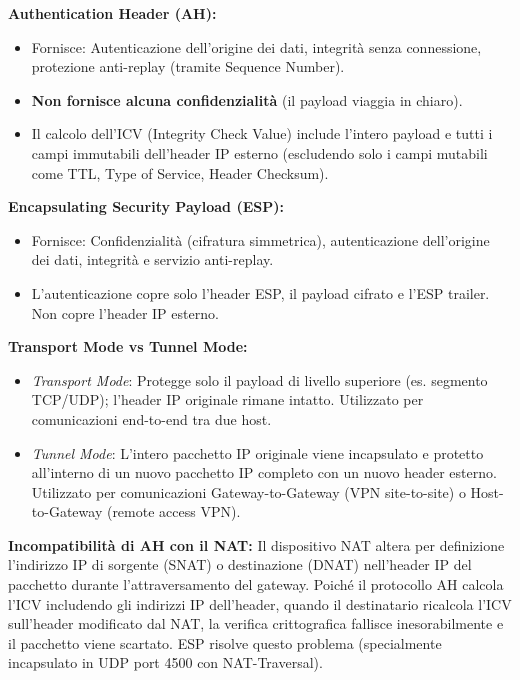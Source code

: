 \documentclass[11pt,a4paper]{article}
\begin{document}
\begin{solutionbox}
\textbf{Authentication Header (AH):}
\begin{itemize}
    \item Fornisce: Autenticazione dell'origine dei dati, integrit\`a senza connessione, protezione anti-replay (tramite Sequence Number).
    \item \textbf{Non fornisce alcuna confidenzialit\`a} (il payload viaggia in chiaro).
    \item Il calcolo dell'ICV (Integrity Check Value) include l'intero payload e tutti i campi immutabili dell'header IP esterno (escludendo solo i campi mutabili come TTL, Type of Service, Header Checksum).
\end{itemize}

\textbf{Encapsulating Security Payload (ESP):}
\begin{itemize}
    \item Fornisce: Confidenzialit\`a (cifratura simmetrica), autenticazione dell'origine dei dati, integrit\`a e servizio anti-replay.
    \item L'autenticazione copre solo l'header ESP, il payload cifrato e l'ESP trailer. Non copre l'header IP esterno.
\end{itemize}

\textbf{Transport Mode vs Tunnel Mode:}
\begin{itemize}
    \item \textit{Transport Mode}: Protegge solo il payload di livello superiore (es. segmento TCP/UDP); l'header IP originale rimane intatto. Utilizzato per comunicazioni end-to-end tra due host.
    \item \textit{Tunnel Mode}: L'intero pacchetto IP originale viene incapsulato e protetto all'interno di un nuovo pacchetto IP completo con un nuovo header esterno. Utilizzato per comunicazioni Gateway-to-Gateway (VPN site-to-site) o Host-to-Gateway (remote access VPN).
\end{itemize}

\textbf{Incompatibilit\`a di AH con il NAT:}
Il dispositivo NAT altera per definizione l'indirizzo IP di sorgente (SNAT) o destinazione (DNAT) nell'header IP del pacchetto durante l'attraversamento del gateway. Poich\'e il protocollo AH calcola l'ICV includendo gli indirizzi IP dell'header, quando il destinatario ricalcola l'ICV sull'header modificato dal NAT, la verifica crittografica fallisce inesorabilmente e il pacchetto viene scartato. ESP risolve questo problema (specialmente incapsulato in UDP port 4500 con NAT-Traversal).
\end{solutionbox}
\end{document}
